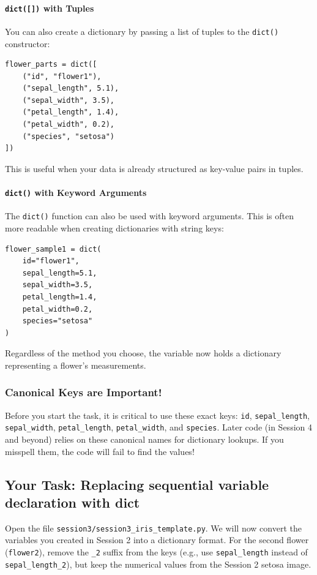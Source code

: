 \paragraph{\texttt{dict([])} with Tuples}
You can also create a dictionary by passing a list of tuples to the \texttt{dict()} constructor:

\begin{verbatim}
flower_parts = dict([
    ("id", "flower1"),
    ("sepal_length", 5.1),
    ("sepal_width", 3.5),
    ("petal_length", 1.4),
    ("petal_width", 0.2),
    ("species", "setosa")
])
\end{verbatim}
This is useful when your data is already structured as key-value pairs in tuples.

\paragraph{\texttt{dict()} with Keyword Arguments}
The \texttt{dict()} function can also be used with keyword arguments. This is often more readable when creating dictionaries with string keys:

\begin{verbatim}
flower_sample1 = dict(
    id="flower1",
    sepal_length=5.1,
    sepal_width=3.5,
    petal_length=1.4,
    petal_width=0.2,
    species="setosa"
)
\end{verbatim}

Regardless of the method you choose, the variable now holds a dictionary representing a flower's measurements.

\subsubsection{Canonical Keys are Important!}
Before you start the task, it is critical to use these exact keys: \texttt{id}, \texttt{sepal\_length}, \texttt{sepal\_width}, \texttt{petal\_length}, \texttt{petal\_width}, and \texttt{species}. Later code (in Session 4 and beyond) relies on these canonical names for dictionary lookups. If you misspell them, the code will fail to find the values!

\subsection{Your Task: Replacing sequential variable declaration with dict}
Open the file \texttt{session3/session3\_iris\_template.py}. 
We will now convert the variables you created in Session 2 into a dictionary format. 
For the second flower (\texttt{flower2}), remove the \texttt{\_2} suffix from the keys (e.g., use \texttt{sepal\_length} instead of \texttt{sepal\_length\_2}), but keep the numerical values from the Session 2 setosa image.

